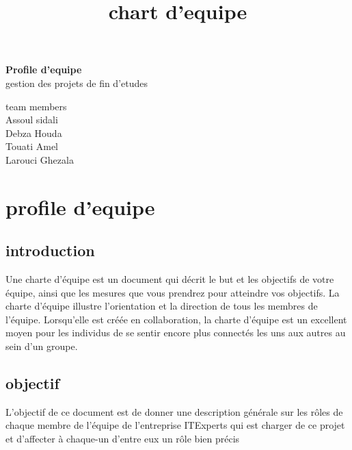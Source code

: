 \documentclass[11pt,fleqn]{book} %
\begin{document}
\title{chart d'equipe}
\begingroup
\thispagestyle{empty}
\centering
\vspace*{5cm}
\par\normalfont\fontsize{35}{35}\sffamily\selectfont
\textbf{Profile d'equipe}\\
{\LARGE gestion des projets de fin d'etudes}\par %
\vspace*{2cm}
\raggedright
{\Huge team members \\}
\vspace*{0.5cm}
{\huge 
Assoul sidali \\
Debza Houda\\
Touati Amel\\
Larouci Ghezala\\}\par %
\endgroup


\pagestyle{empty} %

\tableofcontents %


\pagestyle{fancy} %
\chapter{profile d'equipe}
\section{introduction}
Une charte d'équipe est un document qui décrit le but et les objectifs de votre équipe, ainsi que les mesures que vous prendrez pour atteindre vos objectifs. La charte d'équipe illustre l'orientation et la direction de tous les membres de l'équipe. Lorsqu'elle est créée en collaboration, la charte d'équipe est un excellent moyen pour les individus de se sentir encore plus connectés les uns aux autres au sein d'un groupe.
\newline
\newline
\section{objectif}
L’objectif de ce document est de donner une description générale sur les rôles de chaque membre de l’équipe de l’entreprise ITExperts qui est charger de ce projet et d’affecter à chaque-un d’entre eux un rôle bien précis
\newline
\newline
\end{document}

